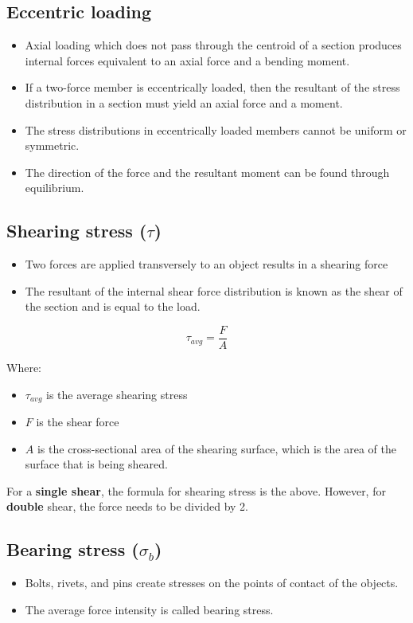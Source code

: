 \documentclass[11pt]{article}
\begin{document}
\newpage

\subsection{Eccentric loading}
\label{sec:org9307769}
\begin{itemize}
\item Axial loading which does not pass through the centroid of a section produces internal forces equivalent to an axial force and a bending moment.
\item If a two-force member is eccentrically loaded, then the resultant of the stress distribution in a section must yield an axial force and a moment.
\item The stress distributions in eccentrically loaded members cannot be uniform or symmetric.
\item The direction of the force and the resultant moment can be found through equilibrium.
\end{itemize}

\subsection{Shearing stress (\(\tau\))}
\label{sec:org2c26c8b}
\begin{itemize}
\item Two forces are applied transversely to an object results in a shearing force
\item The resultant of the internal shear force distribution is known as the shear of the section and is equal to the load.
\end{itemize}

\[\tau_{avg} = \frac{F}{A}\]

Where:
\begin{itemize}
\item \(\tau_{avg}\) is the average shearing stress
\item \(F\) is the shear force
\item \(A\) is the cross-sectional area of the shearing surface, which is the area of the surface that is being sheared.
\end{itemize}

For a \textbf{single shear}, the formula for shearing stress is the above. However, for \textbf{double} shear, the force needs to be divided by 2.

\newpage

\subsection{Bearing stress (\(\sigma_b\))}
\label{sec:org2325a1b}
\begin{itemize}
\item Bolts, rivets, and pins create stresses on the points of contact of the objects.
\item The average force intensity is called bearing stress.
\end{itemize}
\end{document}
